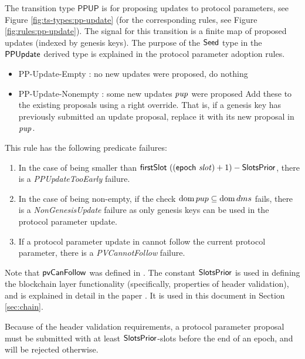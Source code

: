 The transition type $\mathsf{PPUP}$ is for proposing updates to protocol
parameters, see Figure \ref{fig:ts-types:pp-update} (for the corresponding rules,
see Figure \ref{fig:rules:pp-update}).
The signal for this transition is a finite map of proposed updates (indexed by
genesis keys). The purpose of the $\mathsf{Seed}$ type in the $\mathsf{PPUpdate}$ derived type is explained
in the protocol parameter adoption rules.

\begin{itemize}
  \item PP-Update-Empty : no new updates were proposed, do nothing
  \item PP-Update-Nonempty : some new updates $\mathit{pup}$ were proposed
  Add these to
  the existing proposals using a right override. That is, if a genesis key
  has previously submitted an update proposal, replace it with its new
  proposal in $\mathit{pup}$.
\end{itemize}

This rule has the following predicate failures:

\begin{enumerate}
\item In the case of  being smaller than
  $\mathsf{firstSlot}~((\mathsf{epoch}~\mathit{slot}) + 1) - \mathsf{SlotsPrior}$, there is
  a \emph{PPUpdateTooEarly} failure.
\item In the case of  being non-empty, if the check $\operatorname{dom} pup \subseteq
  \operatorname{dom} dms$ fails, there is a \emph{NonGenesisUpdate} failure as only genesis keys
  can be used in the protocol parameter update.
\item If a protocol parameter update in  cannot follow the current
  protocol parameter, there is a \emph{PVCannotFollow} failure.
\end{enumerate}

Note that $\mathsf{pvCanFollow}$
was defined in \cite{byron_ledger_spec}. The constant $\mathsf{SlotsPrior}$
is used in defining the blockchain layer functionality (specifically,
properties of header validation),
and is explained in detail in the paper \cite{ouroboros_praos}.
It is used in this document in
Section \ref{sec:chain}.

Because of the header validation requirements, a protocol parameter proposal
must be submitted with at least $\mathsf{SlotsPrior}$-slots before the end of an epoch,
and will be rejected otherwise.

